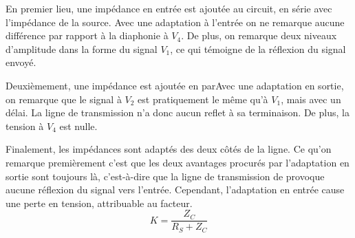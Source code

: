 En premier lieu, une impédance en entrée est ajoutée au circuit, en série avec l'impédance de la source. Avec une adaptation à l'entrée  on ne remarque aucune différence par rapport à la diaphonie à $V_4$. De plus, on remarque deux niveaux d'amplitude dans la forme du signal $V_1$, ce qui témoigne de la réflexion du signal envoyé.

\vspace{0.3cm}
\vspace{0.3cm}

Deuxièmement, une impédance est ajoutée en parAvec une adaptation en sortie, on remarque que le signal à $V_2$ est pratiquement le même qu'à $V_1$, mais avec un délai. La ligne de transmission n'a donc aucun reflet à sa terminaison. De plus, la tension à $V_4$ est nulle.

\vspace{0.3cm}
\vspace{0.3cm}

Finalement, les impédances sont adaptés des deux côtés de la ligne. Ce qu'on remarque premièrement c'est que les deux avantages procurés par l'adaptation en sortie sont toujours là, c'est-à-dire que la ligne de transmission de provoque aucune réflexion du signal vers l'entrée. Cependant, l'adaptation en entrée cause une perte en tension, attribuable au facteur.
\[K = \frac{Z_C}{R_S+Z_C}\]

